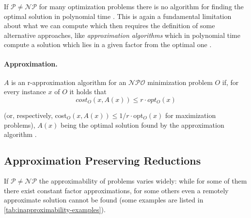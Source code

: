 If $\mathcal{P} \neq \mathcal{NP} $ for many optimization problems there is no
algorithm for finding the optimal solution in polynomial time
\cite{Trevisan2004}. This is again a fundamental limitation about what we can
compute which then requires the definition of some alternative approaches, like
\emph{approximation algorithms}
which in polynomial time
compute a solution which lies in a given factor from the optimal
one \cite{Vazirani2002}.

\paragraph{Approximation.}%
\label{par:r_approximations}

$A$ is an r-approximation algorithm for an $\mathcal{NPO} $ minimization
problem $O$ if, for every instance $x$ of $O$ it holds that
\begin{equation*}
	cost_{O} (x, A(x)) \leq r \cdot opt_{O} (x)
\end{equation*}

\noindent
(or, respectively, cost$_{O} (x, A(x))
	\leq 1/r \cdot $opt$_{O} (x) $ for maximization problems), $A(x)$ being the
optimal solution found by the approximation algorithm \cite{Trevisan2004}.

\subsection{Approximation Preserving Reductions}%
\label{sub:approximation_preserving_reductions}

If $\mathcal{P} \neq \mathcal{NP} $ the approximability of problems varies
widely: while for some of them there exist
constant factor approximations, for some others even a remotely approximate
solution cannot be found \cite{Ausiello2005} (some examples are listed in
\autoref{tab:inapproximability-examples}).

